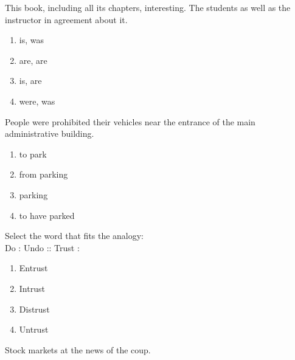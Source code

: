 
\iffalse
\title{2020-EE- 1-13}
\author{EE24BTECH11016 - DHWANITH M DODDAHUNDI}
\section{ee}
\chapter{2020}
\fi


\item This book, including all its chapters, \underline{\hspace{1cm}}interesting. The students as well as the instructor \underline{\hspace{1cm}} in agreement about it.
\begin{enumerate}
    \item is, was
    \item are, are
    \item is, are
    \item were, was
\end{enumerate}
\item People were prohibited \underline{\hspace{1cm}} their vehicles near the entrance of the main administrative building.
\begin{enumerate}
    \item to park
    \item from parking
    \item parking 
    \item to have parked
\end{enumerate}
\item Select the word that fits the analogy: \\
Do : Undo :: Trust :\underline{\hspace{1cm}}
\begin{enumerate}
    \item Entrust
    \item Intrust
    \item Distrust
    \item Untrust
\end{enumerate}
\item Stock markets \underline{\hspace{1cm}} at the news of the coup.

